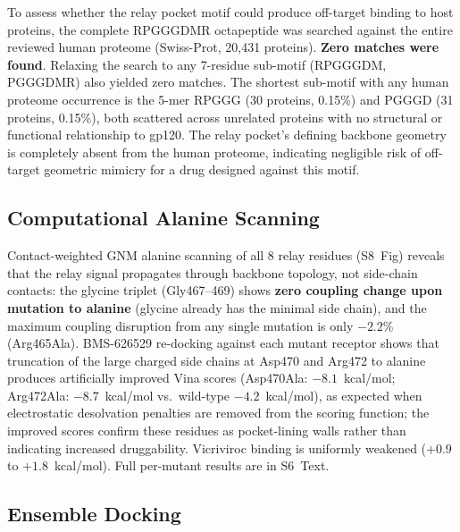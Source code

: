 \documentclass[11pt,a4paper]{article}
\begin{document}
To assess whether the relay pocket motif could produce off-target binding to host proteins, the complete RPGGGDMR octapeptide was searched against the entire reviewed human proteome (Swiss-Prot, 20,431 proteins). \textbf{Zero matches were found}. Relaxing the search to any 7-residue sub-motif (RPGGGDM, PGGGDMR) also yielded zero matches. The shortest sub-motif with any human proteome occurrence is the 5-mer RPGGG (30 proteins, 0.15\%) and PGGGD (31 proteins, 0.15\%), both scattered across unrelated proteins with no structural or functional relationship to gp120. The relay pocket's defining backbone geometry is completely absent from the human proteome, indicating negligible risk of off-target geometric mimicry for a drug designed against this motif.

\subsection{Computational Alanine Scanning}

Contact-weighted GNM alanine scanning of all 8 relay residues (S8~Fig) reveals that the relay signal propagates through backbone topology, not side-chain contacts: the glycine triplet (Gly467--469) shows \textbf{zero coupling change upon mutation to alanine} (glycine already has the minimal side chain), and the maximum coupling disruption from any single mutation is only $-2.2$\% (Arg465Ala). BMS-626529 re-docking against each mutant receptor shows that truncation of the large charged side chains at Asp470 and Arg472 to alanine produces artificially improved Vina scores (Asp470Ala: $-8.1$~kcal/mol; Arg472Ala: $-8.7$~kcal/mol vs.\ wild-type $-4.2$~kcal/mol), as expected when electrostatic desolvation penalties are removed from the scoring function; the improved scores confirm these residues as pocket-lining walls rather than indicating increased druggability. Vicriviroc binding is uniformly weakened ($+0.9$ to $+1.8$~kcal/mol). Full per-mutant results are in S6~Text.

\subsection{Ensemble Docking}
\end{document}
